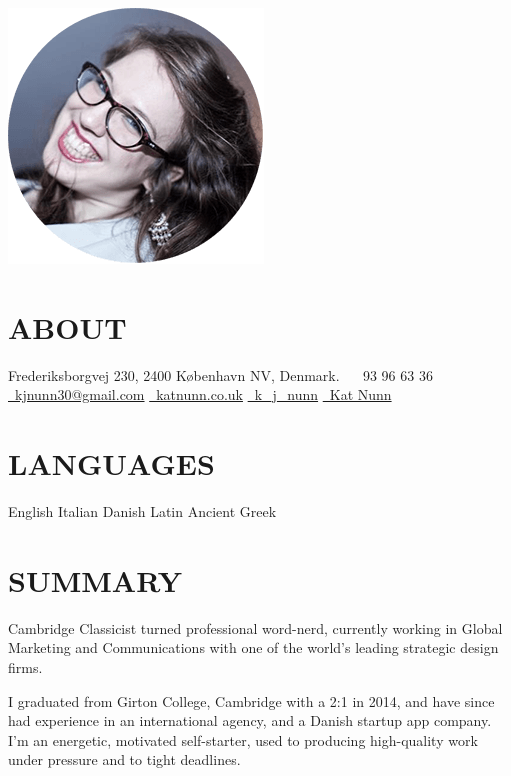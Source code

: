 \documentclass[]{friggeri-cv}
\begin{document}
       {}

\begin{aside}
  \includegraphics[width=.66\textwidth]{../img/profile.png}
  \section{ABOUT}
    Frederiksborgvej 230,
    2400 København NV,
    Denmark.
    ~
	\faPhone~93 96 63 36
	\href{mailto:kjnunn30@gmail.com}{\faEnvelope~kjnunn30@gmail.com}
	\href{https://katnunn.co.uk}{\faGlobe~katnunn.co.uk}
	\href{https://twitter.com/k\_j\_nunn}{\faTwitter~k\_j\_nunn}
	\href{http://uk.linkedin.com/in/katnunn/}{\faLinkedin~Kat Nunn}
  \section{LANGUAGES}
    English
    Italian
    Danish
    Latin
    Ancient Greek
\end{aside}

\section{SUMMARY}
Cambridge Classicist turned professional word-nerd, currently working in Global Marketing and Communications with one of the world's leading strategic \mbox{design} firms. 

I graduated from Girton College, Cambridge with a 2:1 in 2014, and have since had experience in an international agency, and a Danish startup app company. I’m an energetic, motivated self-starter, used to producing high-quality work under pressure and to tight deadlines.
\end{document}
